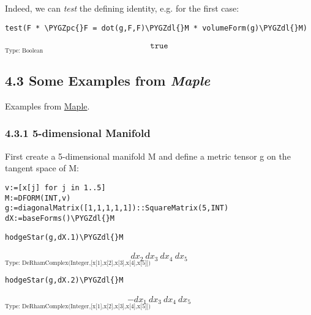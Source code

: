 \documentclass[letterpaper,10pt,english]{sphinxmanual}
\def\PYGZpc{\char`\%}
\def\PYGZdl{\char`\$}
\begin{document}
Indeed, we can \emph{test} the defining identity, e.g. for the first case:

\begin{Verbatim}[commandchars=\\\{\}]
test(F * \PYGZpc{}F = dot(g,F,F)\PYGZdl{}M * volumeForm(g)\PYGZdl{}M)
\end{Verbatim}
\begin{equation*}
\begin{split}\mathtt{true}\end{split}
\end{equation*}
$_{\text{Type: Boolean}}$


\subsection{4.3 Some Examples from \emph{Maple}}
\label{section-4.0:some-examples-from-maple}
Examples from \href{http://www.maplesoft.com/support/help/Maple/view.aspx?path=DifferentialGeometry/Tensor/HodgeStar}{Maple}.


\subsubsection{4.3.1 5-dimensional Manifold}
\label{section-4.0:dimensional-manifold}\label{section-4.0:maple}
First create a 5-dimensional manifold M and define a metric tensor g on the
tangent space of M:

\begin{Verbatim}[commandchars=\\\{\}]
v:=[x[j] for j in 1..5]
M:=DFORM(INT,v)
g:=diagonalMatrix([1,1,1,1,1])::SquareMatrix(5,INT)
dX:=baseForms()\PYGZdl{}M
\end{Verbatim}

\begin{Verbatim}[commandchars=\\\{\}]
hodgeStar(g,dX.1)\PYGZdl{}M
\end{Verbatim}
\begin{equation*}
\begin{split}{dx _ {2}} \  {dx _ {3}} \  {dx _ {4}} \  {dx _ {5}}\end{split}
\end{equation*}
$_{\text{Type: DeRhamComplex(Integer,{[}x{[}1{]},x{[}2{]},x{[}3{]},x{[}4{]},x{[}5{]}{]})}}$

\begin{Verbatim}[commandchars=\\\{\}]
hodgeStar(g,dX.2)\PYGZdl{}M
\end{Verbatim}
\begin{equation*}
\begin{split}-{{dx _ {1}} \  {dx _ {3}} \  {dx _ {4}} \  {dx _ {5}}}\end{split}
\end{equation*}
$_{\text{Type: DeRhamComplex(Integer,{[}x{[}1{]},x{[}2{]},x{[}3{]},x{[}4{]},x{[}5{]}{]})}}$
\end{document}
